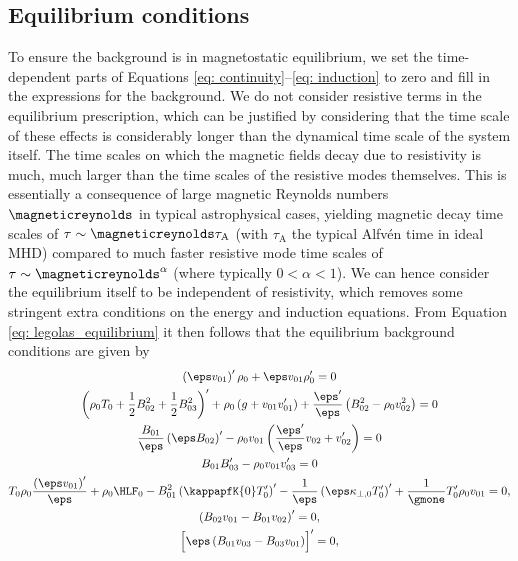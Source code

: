 \subsection{Equilibrium conditions} \label{ss: equilibrium conditions}
To ensure the background is in magnetostatic equilibrium, we set the time-dependent parts of Equations \eqref{eq: continuity}--\eqref{eq: induction} to zero and fill in the expressions for the background. We do not consider resistive terms in the equilibrium prescription, which can be justified by considering that the time scale of these effects is considerably longer than the dynamical time scale of the system itself. The time scales on which the magnetic fields decay due to resistivity is much, much larger than the time scales of the resistive modes themselves. This is essentially a consequence of large magnetic Reynolds numbers $\magneticreynolds$ in typical astrophysical cases, yielding magnetic decay time scales of $\tau \sim \magneticreynolds \tau_\text{A}$ (with $\tau_\text{A}$ the typical Alfv\'en time in ideal MHD) compared to much faster resistive mode time scales of $\tau \sim \magneticreynolds^\alpha$ (where typically $0 < \alpha < 1$). We can hence consider the equilibrium itself to be independent of resistivity, which removes some stringent extra conditions on the energy and induction equations. From Equation \eqref{eq: legolas_equilibrium} it then follows that the equilibrium background conditions are given by
\begin{gather}
  \left(\eps v_{01}\right)'\rho_0 + \eps v_{01}\rho_0' = 0 \\
  \left(\rho_0 T_0 + \frac{1}{2}B_{02}^2 + \frac{1}{2}B_{03}^2\right)'
    + \rho_0\left(g + v_{01}v_{01}'\right)
    + \frac{\eps'}{\eps}\left(B_{02}^2
    - \rho_0 v_{02}^2\right) = 0 \\
  \frac{B_{01}}{\eps}\left(\eps B_{02}\right)' - \rho_0 v_{01}\left(\frac{\eps'}{\eps}v_{02} + v_{02}'\right) = 0 \\
  B_{01}B_{03}' - \rho_0 v_{01}v_{03}' = 0 \\
  T_0 \rho_0 \frac{\left(\eps v_{01}\right)'}{\eps}
    + \rho_0 \HLF_0
    - B_{01}^2\left(\kappapfK{0} T_0'\right)'
    - \frac{1}{\eps}\left(\eps \kappa_{\perp, 0} T_0'\right)'
    + \frac{1}{\gmone}T_0'\rho_0 v_{01} = 0, \label{eq: general_thermal_equilibrium} \\
  \left(B_{02}v_{01} - B_{01}v_{02}\right)' = 0, \\
  \Bigl[\eps \left(B_{01}v_{03} - B_{03}v_{01}\right)\Bigr]' = 0,
\end{gather}
